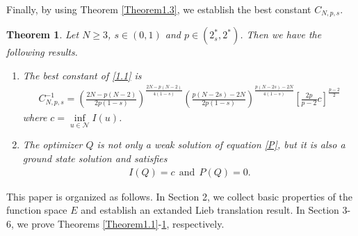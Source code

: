 \documentclass[12pt,a4paper,reqno]{amsart}
\numberwithin{equation}{section}
\newtheorem{theorem}{Theorem}[section]
\begin{document}
Finally, by using Theorem \ref{Theorem1.3}, we establish the best constant $C_{N,p,s}$.
\begin{theorem}\label{Theorem1.4}
Let $N\geqslant3$, $s\in(0,1)$ and $p\in (2^{*}_{s},2^{*})$. Then we have the following results.

\begin{enumerate}
\item [(1)]
The best constant of \eqref{1.1} is
\begin{equation*}
\begin{aligned}
C_{N,p,s}^{-1}
=\left(
\frac{2N-p(N-2)}{2p(1-s)}
\right)
^{\frac{2N-p(N-2)}{4(1-s)}}
\left(
\frac{p(N-2s)-2N}{2p(1-s)}
\right)
^{\frac{p(N-2s)-2N}{4(1-s)}}
\left[
\frac{2p}{p-2}
c
\right]^{\frac{p-2}{2}}
\end{aligned}
\end{equation*}
where $c=\inf\limits_{u\in \mathcal{N}}I(u)$.

\item [(2)]
The optimizer $Q$ is not only a weak solution of equation \eqref{P}, but it is also a ground state solution and satisfies
\begin{equation*}
\begin{aligned}
I(Q)=c~~\mathrm{and}~~P(Q)=0.
\end{aligned}
\end{equation*}
\end{enumerate}
\end{theorem}



This paper is organized as follows. In Section 2, we collect basic properties of the function
space $E$ and establish an extanded Lieb translation result.
In Section 3-6, we prove Theorems \ref{Theorem1.1}-\ref{Theorem1.4},
respectively.
\end{document}
